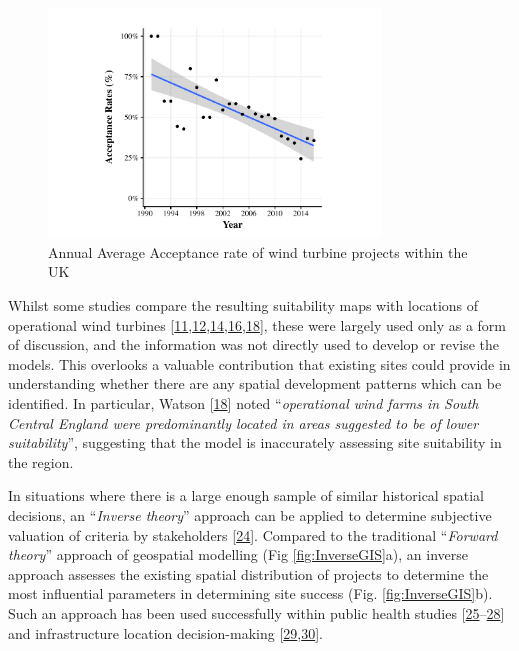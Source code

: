 \documentclass[a4paper,]{article}
\theoremstyle{definition}
\theoremstyle{definition}
\theoremstyle{definition}
\theoremstyle{remark}
\begin{document}
\begin{figure}[h]

{\centering \includegraphics[width=8.8cm]{Wind_Stats_Paper_files/figure-latex/acceptanceRatesWind-1} 

}

\caption{Annual Average Acceptance rate of wind turbine projects within the UK}\label{fig:acceptanceRatesWind}
\end{figure}

Whilst some studies compare the resulting suitability maps with
locations of operational wind turbines
{[}\protect\hyperlink{ref-Aydin2010}{11},\protect\hyperlink{ref-VanHaaren2011}{12},\protect\hyperlink{ref-Gass2013}{14},\protect\hyperlink{ref-Miller2014}{16},\protect\hyperlink{ref-Watson2015}{18}{]},
these were largely used only as a form of discussion, and the
information was not directly used to develop or revise the models. This
overlooks a valuable contribution that existing sites could provide in
understanding whether there are any spatial development patterns which
can be identified. In particular, Watson
{[}\protect\hyperlink{ref-Watson2015}{18}{]} noted ``\emph{operational
wind farms in South Central England were predominantly located in areas
suggested to be of lower suitability}'', suggesting that the model is
inaccurately assessing site suitability in the region.

In situations where there is a large enough sample of similar historical
spatial decisions, an ``\emph{Inverse theory}'' approach can be applied
to determine subjective valuation of criteria by stakeholders
{[}\protect\hyperlink{ref-Cirucci2014}{24}{]}. Compared to the
traditional ``\emph{Forward theory}'' approach of geospatial modelling
(Fig \ref{fig:InverseGIS}a), an inverse approach assesses the existing
spatial distribution of projects to determine the most influential
parameters in determining site success (Fig. \ref{fig:InverseGIS}b).
Such an approach has been used successfully within public health studies
{[}\protect\hyperlink{ref-Brody2002}{25}--\protect\hyperlink{ref-Garcia-Ayllon2013}{28}{]}
and infrastructure location decision-making
{[}\protect\hyperlink{ref-USEPA2002}{29},\protect\hyperlink{ref-Cirucci2015}{30}{]}.
\end{document}
